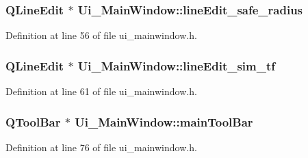 \subsubsection[{\texorpdfstring{line\+Edit\+\_\+safe\+\_\+radius}{lineEdit_safe_radius}}]{\setlength{\rightskip}{0pt plus 5cm}Q\+Line\+Edit $\ast$ Ui\+\_\+\+Main\+Window\+::line\+Edit\+\_\+safe\+\_\+radius}\hypertarget{class_ui___main_window_a381929a8b1f17dedb69a1569d678ca2f}{}\label{class_ui___main_window_a381929a8b1f17dedb69a1569d678ca2f}


Definition at line 56 of file ui\+\_\+mainwindow.\+h.

\subsubsection[{\texorpdfstring{line\+Edit\+\_\+sim\+\_\+tf}{lineEdit_sim_tf}}]{\setlength{\rightskip}{0pt plus 5cm}Q\+Line\+Edit $\ast$ Ui\+\_\+\+Main\+Window\+::line\+Edit\+\_\+sim\+\_\+tf}\hypertarget{class_ui___main_window_a433a1cdefc31a548bb5a3c9b34489d67}{}\label{class_ui___main_window_a433a1cdefc31a548bb5a3c9b34489d67}


Definition at line 61 of file ui\+\_\+mainwindow.\+h.

\subsubsection[{\texorpdfstring{main\+Tool\+Bar}{mainToolBar}}]{\setlength{\rightskip}{0pt plus 5cm}Q\+Tool\+Bar $\ast$ Ui\+\_\+\+Main\+Window\+::main\+Tool\+Bar}\hypertarget{class_ui___main_window_abca26371605d7c5235fab5188d4bdcf7}{}\label{class_ui___main_window_abca26371605d7c5235fab5188d4bdcf7}


Definition at line 76 of file ui\+\_\+mainwindow.\+h.

